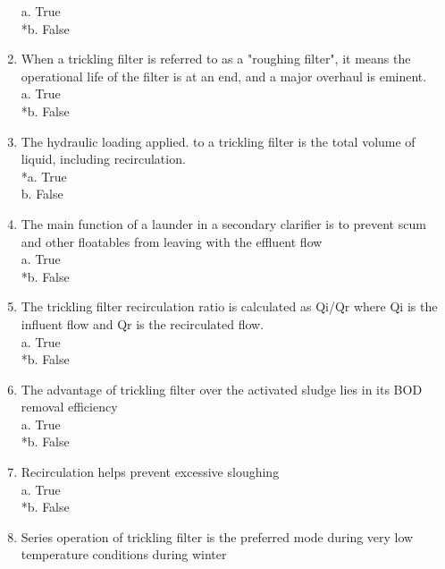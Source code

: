 \begin{enumerate}
a. True \\
*b. False \\


\item  When a trickling filter is referred to as a "roughing filter", it means the operational life of the filter is at an end, and a major overhaul is eminent. \\

a. True \\
*b. False \\


\item  The hydraulic loading applied. to a trickling filter is the total volume of liquid, including recirculation. \\

*a. True \\
b. False \\

\item  The main function of a launder in a secondary clarifier is to prevent scum and other floatables from leaving with the effluent flow \\

a. True\\
*b. False\\

\item  The trickling filter recirculation ratio is calculated as Qi/Qr where Qi is the influent flow and Qr is the recirculated flow. \\

a. True\\
*b. False \\


\item  The advantage of trickling filter over the activated sludge lies in its BOD removal efficiency \\

a. True\\
*b. False\\

\item  Recirculation helps prevent excessive sloughing\\

a. True\\
*b. False\\

\item  Series operation of trickling filter is the preferred mode during very low temperature conditions during winter\\


\end{enumerate}
